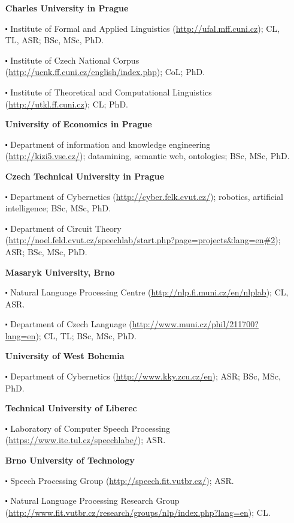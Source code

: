 \begin{multicols}{2}
\begin{enumerate}
\item[] $\!\!\!\!\!\!$\textbf{Charles University in Prague}
\item[$\centerdot$]Institute of Formal and Applied Linguistics (\url{http://ufal.mff.cuni.cz}); CL, TL, ASR; BSc, MSc, PhD.
\item[$\centerdot$]Institute of Czech National Corpus (\url{http://ucnk.ff.cuni.cz/english/index.php}); CoL; PhD.
\item[$\centerdot$]Institute of Theoretical and Computational  Linguistics (\url{http://utkl.ff.cuni.cz}); CL; PhD.
\item[] $\!\!\!\!\!\!$\textbf{University of Economics in Prague}
\item[$\centerdot$]Department of information and knowledge engineering (\url{http://kizi5.vse.cz/}); datamining, semantic web, ontologies; BSc, MSc, PhD.
\item[] $\!\!\!\!\!\!$\textbf{Czech Technical University in Prague}
\item[$\centerdot$]Department of Cybernetics (\url{http://cyber.felk.cvut.cz/}); robotics, artificial intelligence; BSc, MSc, PhD.
\item[$\centerdot$]Department of Circuit Theory (\url{http://noel.feld.cvut.cz/speechlab/start.php?page=projects&lang=en#2}); ASR; BSc, MSc, PhD.
\item[] $\!\!\!\!\!\!$\textbf{Masaryk University, Brno}
\item[$\centerdot$] Natural Language Processing Centre (\url{http://nlp.fi.muni.cz/en/nlplab}); CL, ASR.
\item[$\centerdot$] Department of Czech Language (\url{http://www.muni.cz/phil/211700?lang=en}); CL, TL; BSc, MSc, PhD.
\item[] $\!\!\!\!\!\!$\textbf{University of West Bohemia}
\item[$\centerdot$] Department of Cybernetics (\url{http://www.kky.zcu.cz/en}); ASR; BSc, MSc, PhD.
\item[] $\!\!\!\!\!\!$\textbf{Technical University of Liberec}
\item[$\centerdot$]Laboratory of Computer Speech Processing (\url{https://www.ite.tul.cz/speechlabe/}); ASR.
\item[] $\!\!\!\!\!\!$\textbf{Brno University of Technology}
\item[$\centerdot$]Speech Processing Group (\url{http://speech.fit.vutbr.cz/}); ASR.
\item[$\centerdot$]Natural Language Processing Research Group (\url{http://www.fit.vutbr.cz/research/groups/nlp/index.php?lang=en}); CL.
\end{enumerate}


\end{multicols}
